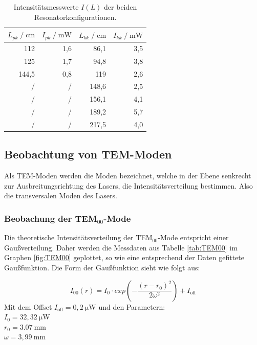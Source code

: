 \begin{table}[H]
  \centering
  \footnotesize
  \caption{Intensitätsmesswerte $I(L)$ der beiden Resonatorkonfigurationen.}
  \label{tab:1}
  \begin{tabular}{r r | r r}
  \toprule
  $L_{pk} \;/\; \si{\centi\meter}$ & $I_{pk} \;/\; \si{\milli\watt}$ & $L_{kk} \;/\; \si{\centi\meter}$ & $I_{kk} \;/\; \si{\milli\watt}$ \\
  \midrule
  112   & 1,6 & 86,1 & 3,5 \\
  125   & 1,7 & 94,8 & 3,8 \\
  144,5 & 0,8 & 119 & 2,6 \\
  /     & /   & 148,6 & 2,5 \\
  /     & /   & 156,1 & 4,1 \\  
  /     & /   & 189,2 & 5,7 \\
  /     & /   & 217,5 & 4,0 \\
  \bottomrule
  \end{tabular}
\end{table}


\subsection{Beobachtung von TEM-Moden}
\label{sec:Beobachtung von TEM-Moden}
Als TEM-Moden werden die Moden bezeichnet, welche in der Ebene senkrecht zur Ausbreitungsrichtung des Lasers, 
die Intensitätsverteilung bestimmen. Also die transversalen Moden des Lasers.

\subsubsection{Beobachung der TEM$_{00}$-Mode}
\label{sec:Beobachung der 00-Mode}
Die theoretische Intensitätsverteilung der TEM$_{00}$-Mode entspricht einer Gaußverteilung. Daher werden die Messdaten aus Tabelle \ref{tab:TEM00} im Graphen \ref{fig:TEM00} geplottet,
so wie eine entsprechend der Daten gefittete Gaußfunktion. Die Form der Gaußfunktion sieht wie folgt aus:

\begin{equation}
\label{equ:}
  I_{00}(r) = I_0 \cdot exp \left(- \frac{(r - r_0)^2}{2 \omega^2}\right) + I_{\text{off}}
\end{equation}
Mit dem Offset $I_{\text{off}} = 0,2 \: \si{\micro\watt}$ und den Parametern:\\
$I_0 = 32,32 \: \si{\micro\watt}$ \\
$r_0 = 3.07 \: \si{\milli\meter}$ \\
$\omega = 3,99 \: \si{\milli\meter}$


